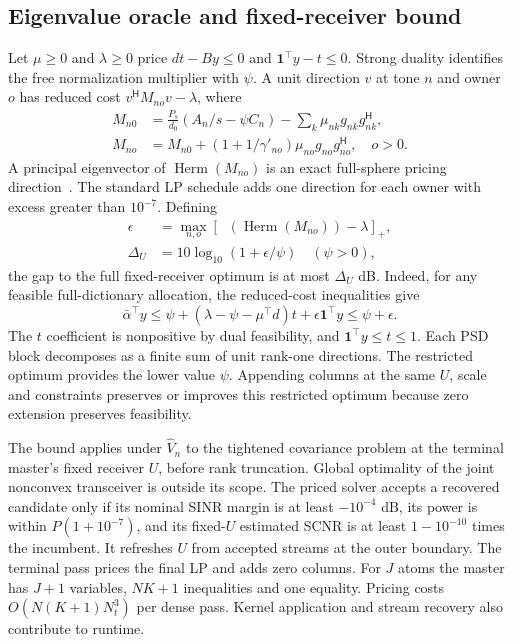 \documentclass[journal]{IEEEtran}
\DeclareMathOperator{\Herm}{Herm}
\DeclareMathOperator{\eigmax}{eig_{\max}}
\newcommand{\HH}{^{\mathsf H}}
\begin{document}
\subsection{Eigenvalue oracle and fixed-receiver bound}
Let \(\mu\ge0\) and \(\lambda\ge0\) price \(dt-By\le0\) and \(\mathbf1^\top y-t\le0\). Strong duality identifies the free normalization multiplier with \(\psi\). A unit direction \(v\) at tone \(n\) and owner \(o\) has reduced cost \(v\HH M_{no}v-\lambda\), where
\begin{equation}
\begin{aligned}
 M_{n0}&=\tfrac{P_s}{d_0}(A_n/s-\psi C_n)
             -\sum_k\mu_{nk}g_{nk}g_{nk}\HH,\\
 M_{no}&=M_{n0}+(1+1/\gamma'_{no})\mu_{no}g_{no}g_{no}\HH,\quad o>0 .
\end{aligned}
\end{equation}
A principal eigenvector of \(\Herm(M_{no})\) is an exact full-sphere pricing direction~\cite{dantzig}. The standard LP schedule adds one direction for each owner with excess greater than \(10^{-7}\). Defining
\begin{align}
 \epsilon&=\max_{n,o}[\eigmax(\Herm(M_{no}))-\lambda]_+,\\
 \Delta_U&=10\log_{10}(1+\epsilon/\psi)\quad(\psi>0),
 \label{eq:bound}
\end{align}
the gap to the full fixed-receiver optimum is at most \(\Delta_U\) dB. Indeed, for any feasible full-dictionary allocation, the reduced-cost inequalities give
\begin{equation}
 \bar\alpha^\top y
 \le\psi+(\lambda-\psi-\mu^\top d)t+\epsilon\mathbf1^\top y
 \le\psi+\epsilon .
\end{equation}
The \(t\) coefficient is nonpositive by dual feasibility, and \(\mathbf1^\top y\le t\le1\). Each PSD block decomposes as a finite sum of unit rank-one directions. The restricted optimum provides the lower value \(\psi\). Appending columns at the same \(U\), scale and constraints preserves or improves this restricted optimum because zero extension preserves feasibility.

The bound applies under \(\widehat V_n\) to the tightened covariance problem at the terminal master's fixed receiver \(U\), before rank truncation. Global optimality of the joint nonconvex transceiver is outside its scope. The priced solver accepts a recovered candidate only if its nominal SINR margin is at least \(-10^{-4}\) dB, its power is within \(P(1+10^{-7})\), and its fixed-\(U\) estimated SCNR is at least \(1-10^{-10}\) times the incumbent. It refreshes \(U\) from accepted streams at the outer boundary. The terminal pass prices the final LP and adds zero columns. For \(J\) atoms the master has \(J+1\) variables, \(NK+1\) inequalities and one equality. Pricing costs \(O(N(K+1)N_t^3)\) per dense pass. Kernel application and stream recovery also contribute to runtime.
\end{document}
